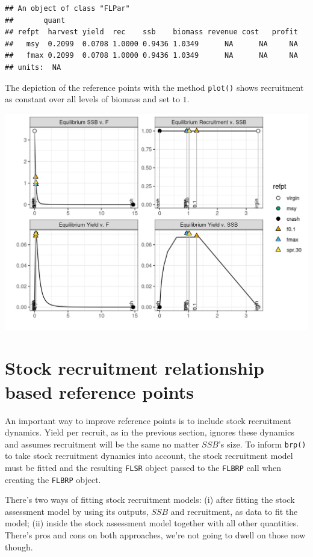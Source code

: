 \documentclass[
]{book}
\begin{document}
\begin{verbatim}
## An object of class "FLPar"
##       quant
## refpt  harvest yield  rec    ssb    biomass revenue cost   profit
##   msy  0.2099  0.0708 1.0000 0.9436 1.0349      NA      NA     NA
##   fmax 0.2099  0.0708 1.0000 0.9436 1.0349      NA      NA     NA
## units:  NA
\end{verbatim}

The depiction of the reference points with the method \texttt{plot()} shows recruitment as constant over all levels of biomass and set to \(1\).

\includegraphics{_bookdown_files/_main_files/figure-html/reference points-1.png}

\hypertarget{stock-recruitment-relationship-based-reference-points}{%
\section{Stock recruitment relationship based reference points}\label{stock-recruitment-relationship-based-reference-points}}

An important way to improve reference points is to include stock recruitment dynamics. Yield per recruit, as in the previous section, ignores these dynamics and assumes recruitment will be the same no matter \(SSB\)'s size. To inform \texttt{brp()} to take stock recruitment dynamics into account, the stock recruitment model must be fitted and the resulting \texttt{FLSR} object passed to the \texttt{FLBRP} call when creating the \texttt{FLBRP} object.

There's two ways of fitting stock recruitment models: (i) after fitting the stock assessment model by using its outputs, \(SSB\) and recruitment, as data to fit the model; (ii) inside the stock assessment model together with all other quantities. There's pros and cons on both approaches, we're not going to dwell on those now though.
\end{document}
